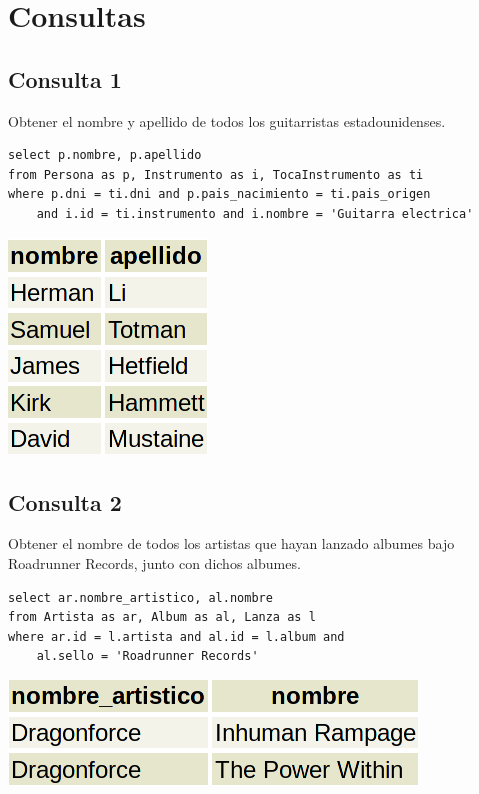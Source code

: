 \documentclass[10pt,a4paper]{article}
\begin{document}
\newpage

\section{Consultas}

\subsection{Consulta 1}
Obtener el nombre y apellido de todos los guitarristas estadounidenses.

\begin{lstlisting}
select p.nombre, p.apellido
from Persona as p, Instrumento as i, TocaInstrumento as ti
where p.dni = ti.dni and p.pais_nacimiento = ti.pais_origen
	and i.id = ti.instrumento and i.nombre = 'Guitarra electrica'
\end{lstlisting}

\includegraphics[scale=0.35]{resultado_consulta_1.png}


\subsection{Consulta 2}
Obtener el nombre de todos los artistas que hayan lanzado albumes bajo Roadrunner Records, junto con dichos albumes.

\begin{lstlisting}
select ar.nombre_artistico, al.nombre
from Artista as ar, Album as al, Lanza as l
where ar.id = l.artista and al.id = l.album and
	al.sello = 'Roadrunner Records'
\end{lstlisting}


\includegraphics[scale=0.35]{resultado_consulta_2.png}
\end{document}
